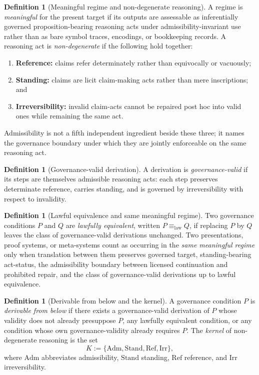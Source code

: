\documentclass[11pt]{article}
\theoremstyle{plain}
\theoremstyle{definition}
\newtheorem{definition}[theorem]{Definition}
\newcommand{\Adm}{\mathrm{Adm}}
\newcommand{\Stand}{\mathrm{Stand}}
\begin{document}
\begin{definition}[Meaningful regime and non-degenerate reasoning]
A regime is \emph{meaningful} for the present target if its outputs are assessable as inferentially governed proposition-bearing reasoning acts under admissibility-invariant use rather than as bare symbol traces, encodings, or bookkeeping records. A reasoning act is \emph{non-degenerate} if the following hold together:
\begin{enumerate}[label=(\roman*), leftmargin=2.5em]
    \item \textbf{Reference:} claims refer determinately rather than equivocally or vacuously;
    \item \textbf{Standing:} claims are licit claim-making acts rather than mere inscriptions; and
    \item \textbf{Irreversibility:} invalid claim-acts cannot be repaired post hoc into valid ones while remaining the same act.
\end{enumerate}
Admissibility is not a fifth independent ingredient beside these three; it names the governance boundary under which they are jointly enforceable on the same reasoning act.
\end{definition}

\begin{definition}[Governance-valid derivation]
A derivation is \emph{governance-valid} if its steps are themselves admissible reasoning acts: each step preserves determinate reference, carries standing, and is governed by irreversibility with respect to invalidity.
\end{definition}

\begin{definition}[Lawful equivalence and same meaningful regime]
Two governance conditions $P$ and $Q$ are \emph{lawfully equivalent}, written $P\equiv_{\mathrm{law}} Q$, if replacing $P$ by $Q$ leaves the class of governance-valid derivations unchanged. Two presentations, proof systems, or meta-systems count as occurring in the \emph{same meaningful regime} only when translation between them preserves governed target, standing-bearing act-status, the admissibility boundary between licensed continuation and prohibited repair, and the class of governance-valid derivations up to lawful equivalence.
\end{definition}

\begin{definition}[Derivable from below and the kernel]
A governance condition $P$ is \emph{derivable from below} if there exists a governance-valid derivation of $P$ whose validity does not already presuppose $P$, any lawfully equivalent condition, or any condition whose own governance-validity already requires $P$. The \emph{kernel} of non-degenerate reasoning is the set
\[
K:=\{\Adm,\Stand,\mathrm{Ref},\mathrm{Irr}\},
\]
where $\Adm$ abbreviates admissibility, $\Stand$ standing, $\mathrm{Ref}$ reference, and $\mathrm{Irr}$ irreversibility.
\end{definition}
\end{document}
